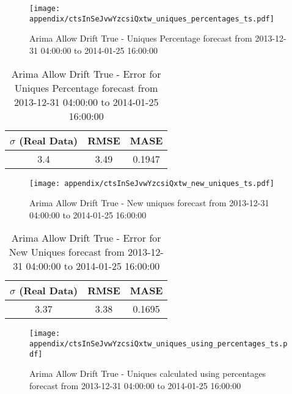 \begin{figure}[H] \begin{center} \leavevmode
\texttt{[image: appendix/ctsInSeJvwYzcsiQxtw\_uniques\_percentages\_ts.pdf]} \caption[]{
Arima Allow Drift True - Uniques Percentage forecast from 2013-12-31 04:00:00 to 2014-01-25 16:00:00} \label{fig:appendix/ctsInSeJvwYzcsiQxtw_uniques_percentages_ts.pdf} \end{center}
\end{figure}

\begin{table}[H]
\centering
\footnotesize
\begin{tabular}{ccc}
$\sigma$ (Real Data) & RMSE & MASE   \\ \hline
3.4 & 3.49 & 0.1947 \\
\end{tabular}

\vspace{0.5cm}

\caption[]{
Arima Allow Drift True - Error for Uniques Percentage forecast from 2013-12-31 04:00:00 to 2014-01-25 16:00:00}
\end{table}

\begin{figure}[H] \begin{center} \leavevmode
\texttt{[image: appendix/ctsInSeJvwYzcsiQxtw\_new\_uniques\_ts.pdf]} \caption[]{
Arima Allow Drift True - New uniques forecast from 2013-12-31 04:00:00 to 2014-01-25 16:00:00} \label{fig:appendix/ctsInSeJvwYzcsiQxtw_new_uniques_ts.pdf} \end{center}
\end{figure}

\begin{table}[H]
\centering
\footnotesize
\begin{tabular}{ccc}
$\sigma$ (Real Data) & RMSE & MASE   \\ \hline
3.37 & 3.38 & 0.1695 \\
\end{tabular}

\vspace{0.5cm}

\caption[]{
Arima Allow Drift True - Error for New Uniques forecast from 2013-12-31 04:00:00 to 2014-01-25 16:00:00}
\end{table}

\begin{figure}[H] \begin{center} \leavevmode
\texttt{[image: appendix/ctsInSeJvwYzcsiQxtw\_uniques\_using\_percentages\_ts.pdf]} \caption[]{
Arima Allow Drift True - Uniques calculated using percentages forecast from 2013-12-31 04:00:00 to 2014-01-25 16:00:00} \label{fig:appendix/ctsInSeJvwYzcsiQxtw_uniques_using_percentages_ts.pdf} \end{center}
\end{figure}


